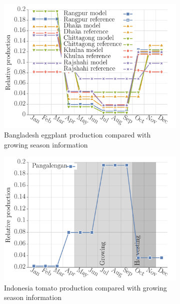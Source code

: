 \documentclass[10pt]{article}
\theoremstyle{definition}
\begin{document}
\begin{figure}[!ht]
\begin{subfigure}[b]{.32\textwidth}
\includegraphics[width=\textwidth]{../production/results/prod_eggplant_BGD.pdf}
\caption{Bangladesh eggplant production compared with growing season
    information~\cite{bbs2017}}
\end{subfigure}
\begin{subfigure}[b]{.32\textwidth}
\includegraphics[width=\textwidth]{../production/results/prod_tomato_IDN.pdf}
\caption{Indonesia tomato production compared with growing season
    information~\cite{arsanti2015}}
\end{subfigure}
\begin{subfigure}[b]{.32\textwidth}

\end{subfigure}
\end{figure}
\end{document}
